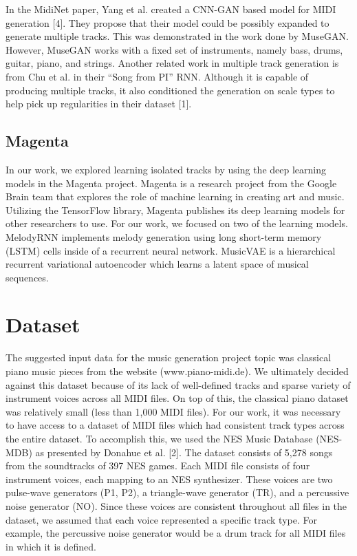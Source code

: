 \documentclass{article}
\begin{document}
In the MidiNet paper, Yang et al. created a CNN-GAN based model for MIDI generation [4]. They propose that their model could be possibly expanded to generate multiple tracks. This was demonstrated in the work done by MuseGAN. However, MuseGAN works with a fixed set of instruments, namely bass, drums, guitar, piano, and strings. Another related work in multiple track generation is from Chu et al. in their “Song from PI” RNN. Although it is capable of producing multiple tracks, it also conditioned the generation on scale types to help pick up regularities in their dataset [1].

\subsection{Magenta}

In our work, we explored learning isolated tracks by using the deep learning models in the Magenta project. Magenta is a research project from the Google Brain team that explores the role of machine learning in creating art and music. Utilizing the TensorFlow library, Magenta publishes its deep learning models for other researchers to use. For our work, we focused on two of the learning models. MelodyRNN implements melody generation using long short-term memory (LSTM) cells inside of a recurrent neural network. MusicVAE is a hierarchical recurrent variational autoencoder which learns a latent space of musical sequences.


\section{Dataset}

The suggested input data for the music generation project topic was classical piano music pieces from the website (www.piano-midi.de). We ultimately decided against this dataset because of its lack of well-defined tracks and sparse variety of instrument voices across all MIDI files. On top of this, the classical piano dataset was relatively small (less than 1,000 MIDI files). For our work, it was necessary to have access to a dataset of MIDI files which had consistent track types across the entire dataset. To accomplish this, we used the NES Music Database (NES-MDB) as presented by Donahue et al. [2]. The dataset consists of 5,278 songs from the soundtracks of 397 NES games. Each MIDI file consists of four instrument voices, each mapping to an NES synthesizer. These voices are two pulse-wave generators (P1, P2), a triangle-wave generator (TR), and a percussive noise generator (NO). Since these voices are consistent throughout all files in the dataset, we assumed that each voice represented a specific track type. For example, the percussive noise generator would be a drum track for all MIDI files in which it is defined.
\end{document}

